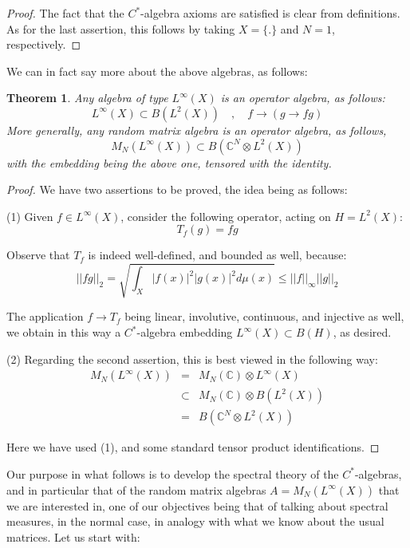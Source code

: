 \documentclass[12pt]{amsbook}
\newtheorem{theorem}{Theorem}[chapter]
\begin{document}
\begin{proof}
The fact that the $C^*$-algebra axioms are satisfied is clear from definitions. As for the last assertion, this follows by taking $X=\{.\}$ and $N=1$, respectively.
\end{proof}

We can in fact say more about the above algebras, as follows:

\begin{theorem}
Any algebra of type $L^\infty(X)$ is an operator algebra, as follows:
$$L^\infty(X)\subset B(L^2(X))\quad,\quad 
f\to(g\to fg)$$
More generally, any random matrix algebra is an operator algebra, as follows,
$$M_N(L^\infty(X))\subset B\left(\mathbb C^N\otimes L^2(X)\right)$$
with the embedding being the above one, tensored with the identity.
\end{theorem}

\begin{proof}
We have two assertions to be proved, the idea being as follows:

\medskip

(1) Given $f\in L^\infty(X)$, consider the following operator, acting on $H=L^2(X)$:
$$T_f(g)=fg$$

Observe that $T_f$ is indeed well-defined, and bounded as well, because:
$$||fg||_2
=\sqrt{\int_X|f(x)|^2|g(x)|^2d\mu(x)}
\leq||f||_\infty||g||_2$$

The application $f\to T_f$ being linear, involutive, continuous, and injective as well, we obtain in this way a $C^*$-algebra embedding $L^\infty(X)\subset B(H)$, as desired.

\medskip

(2) Regarding the second assertion, this is best viewed in the following way:
\begin{eqnarray*}
M_N(L^\infty(X))
&=&M_N(\mathbb C)\otimes L^\infty(X)\\
&\subset&M_N(\mathbb C)\otimes B(L^2(X))\\
&=&B\left(\mathbb C^N\otimes L^2(X)\right)
\end{eqnarray*}

Here we have used (1), and some standard tensor product identifications.
\end{proof}

Our purpose in what follows is to develop the spectral theory of the $C^*$-algebras, and in particular that of the random matrix algebras $A=M_N(L^\infty(X))$ that we are interested in, one of our objectives being that of talking about spectral measures, in the normal case, in analogy with what we know about the usual matrices. Let us start with:
\end{document}
